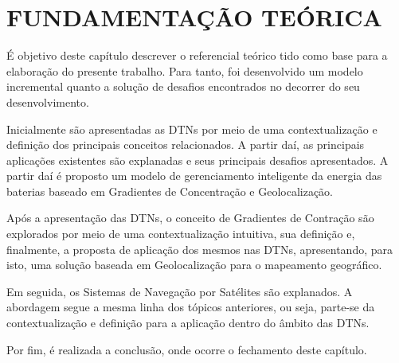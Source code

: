 \chapter{FUNDAMENTAÇÃO TEÓRICA}\label{fund}

É objetivo deste capítulo descrever o referencial teórico tido como base para a elaboração do presente trabalho. Para tanto, foi desenvolvido um modelo incremental quanto a solução de desafios encontrados no decorrer do seu desenvolvimento.

Inicialmente são apresentadas as DTNs por meio de uma contextualização e definição dos principais conceitos relacionados. A partir daí, as principais aplicações existentes são explanadas e seus principais desafios apresentados. A partir daí é proposto um modelo de gerenciamento inteligente da energia das baterias baseado em Gradientes de Concentração e Geolocalização.

Após a apresentação das DTNs, o conceito de Gradientes de Contração são explorados por meio de uma contextualização intuitiva, sua definição e, finalmente, a proposta de aplicação dos mesmos nas DTNs, apresentando, para isto, uma solução baseada em Geolocalização para o mapeamento geográfico.

Em seguida, os Sistemas de Navegação por Satélites são explanados. A abordagem segue a mesma linha dos tópicos anteriores, ou seja, parte-se da contextualização e definição para a aplicação dentro do âmbito das DTNs.

Por fim, é realizada a conclusão, onde ocorre o fechamento deste capítulo.







